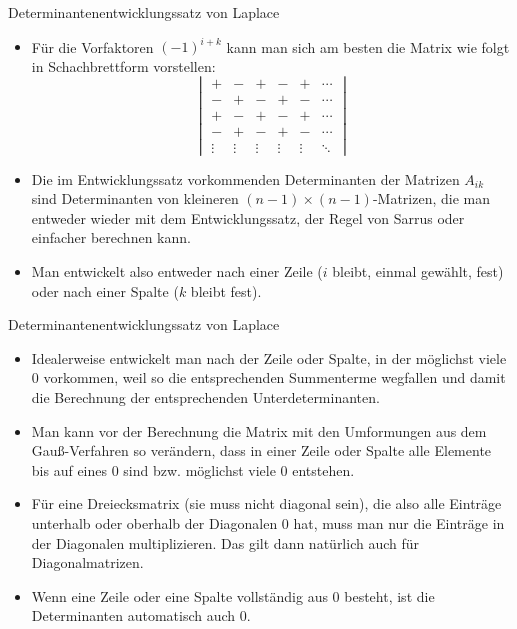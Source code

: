 \begin{frame}{Determinantenentwicklungssatz von Laplace}
	\begin{bemerkung}
		\begin{itemize}
			\item Für die Vorfaktoren $(-1)^{i+k}$ kann man sich am besten die Matrix wie folgt in Schachbrettform vorstellen:
			\[
				\begin{vmatrix}
				+ & - & + & - & + & \cdots \\
			    - & + & - & + & - & \cdots \\
				+ & - & + & - & + & \cdots \\
				- & + & - & + & - & \cdots \\
				\vdots & \vdots & \vdots & \vdots & \vdots & \ddots
				\end{vmatrix}
			\]
			\item Die im Entwicklungssatz vorkommenden Determinanten der Matrizen $A_{ik}$ sind Determinanten von kleineren $(n-1) \times (n-1)$-Matrizen, die man entweder wieder mit dem Entwicklungssatz, der Regel von Sarrus oder einfacher berechnen kann.
			\item Man entwickelt also entweder nach einer Zeile ($i$ bleibt, einmal gewählt, fest) oder nach einer Spalte ($k$ bleibt fest).
		\end{itemize}
	\end{bemerkung}
\end{frame}

\begin{frame}{Determinantenentwicklungssatz von Laplace}
	\begin{bemerkung}
	\begin{itemize}
		\item Idealerweise entwickelt man nach der Zeile oder Spalte, in der möglichst viele 0 vorkommen, weil so die entsprechenden Summenterme wegfallen und damit die Berechnung der entsprechenden Unterdeterminanten.
		\item Man kann vor der Berechnung die Matrix mit den Umformungen aus dem Gauß-Verfahren so verändern, dass in einer Zeile oder Spalte alle Elemente bis auf eines 0 sind bzw. möglichst viele 0 entstehen.
		\item Für eine Dreiecksmatrix (sie muss nicht diagonal sein), die also alle Einträge unterhalb oder oberhalb der Diagonalen 0 hat, muss  man nur die Einträge in der Diagonalen multiplizieren. Das gilt dann natürlich auch für Diagonalmatrizen.
		\item Wenn eine Zeile oder eine Spalte vollständig aus 0 besteht, ist die Determinanten automatisch auch 0.
	\end{itemize}
	\end{bemerkung}
\end{frame}

